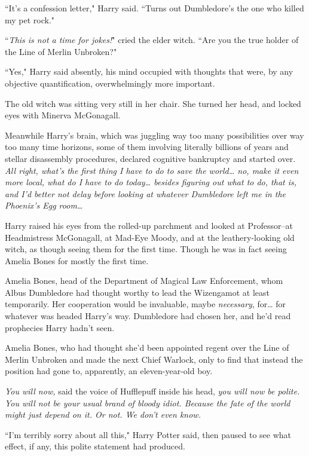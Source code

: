 ``It's a confession letter," Harry said. ``Turns out Dumbledore's the one who killed my pet rock."

``\emph{This is not a time for jokes!}" cried the elder witch. ``Are you the true holder of the Line of Merlin Unbroken?"

``Yes," Harry said absently, his mind occupied with thoughts that were, by any objective quantification, overwhelmingly more important.

The old witch was sitting very still in her chair. She turned her head, and locked eyes with Minerva McGonagall.

Meanwhile Harry's brain, which was juggling way too many possibilities over way too many time horizons, some of them involving literally billions of years and stellar disassembly procedures, declared cognitive bankruptcy and started over. \emph{All right, what's the \emph{first} thing I have to do to save the world{\ldots} no, make it even more local, what do I have to do \emph{today{\ldots}} besides figuring out what to do, that is, and I'd better not delay before looking at whatever Dumbledore left me in the Phoenix's Egg room{\ldots}}

Harry raised his eyes from the rolled-up parchment and looked at Professor\---at Headmistress McGonagall, at Mad-Eye Moody, and at the leathery-looking old witch, as though seeing them for the first time. Though he was in fact seeing Amelia Bones for mostly the first time.

Amelia Bones, head of the Department of Magical Law Enforcement, whom Albus Dumbledore had thought worthy to lead the Wizengamot at least temporarily. Her cooperation would be invaluable, maybe \emph{necessary}, for{\ldots} for whatever was headed Harry's way. Dumbledore had chosen her, and he'd read prophecies Harry hadn't seen.

Amelia Bones, who had thought she'd been appointed regent over the Line of Merlin Unbroken and made the next Chief Warlock, only to find that instead the position had gone to, apparently, an eleven-year-old boy.

\emph{You will now,} said the voice of Hufflepuff inside his head, \emph{you will now be polite. You will not be your usual brand of bloody idiot. Because the fate of the world might just depend on it. Or not. We don't even know.}

``I'm terribly sorry about all this," Harry Potter said, then paused to see what effect, if any, this polite statement had produced.


